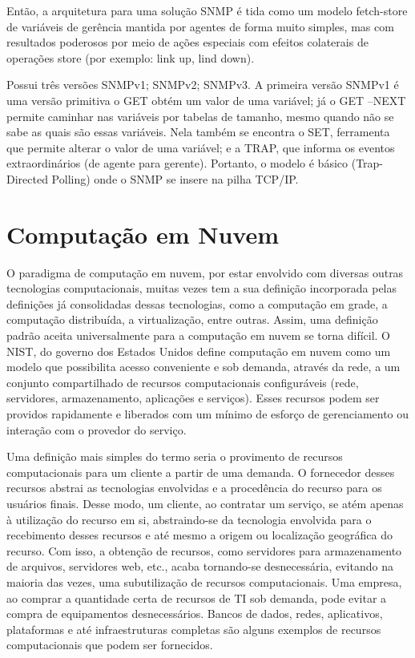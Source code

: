 Então, a arquitetura para uma solução SNMP é tida como um modelo fetch-store de
variáveis de gerência mantida por agentes de forma muito simples, mas com
resultados poderosos por meio de ações especiais com efeitos colaterais de
operações store (por exemplo: link up, lind down).

Possui três versões SNMPv1; SNMPv2; SNMPv3. A primeira versão SNMPv1 é uma
versão primitiva o GET obtém um valor de uma variável; já o GET –NEXT permite
caminhar nas variáveis por tabelas de tamanho, mesmo quando não se sabe as quais
são essas variáveis. Nela também se encontra o SET, ferramenta que permite
alterar o valor de uma variável; e a TRAP, que informa os eventos
extraordinários (de agente para gerente). Portanto, o modelo é básico
(Trap-Directed Polling) onde o SNMP se insere na pilha TCP/IP.

\lipsum[4]

\lipsum[5-6]

\chapter[Computação em Nuvem]{Computação em Nuvem}
\label{computacaoemnuvem}

O paradigma de computação em nuvem, por estar envolvido com diversas outras
tecnologias computacionais, muitas vezes tem a sua definição incorporada pelas
definições já consolidadas dessas tecnologias, como a computação em grade, a
computação distribuída, a virtualização, entre outras. Assim, uma definição
padrão aceita universalmente para a computação em nuvem se torna difícil. O
\textsf{NIST}, do governo dos Estados Unidos define computação em nuvem como um
modelo que possibilita acesso conveniente e sob demanda, através da rede, a um
conjunto compartilhado de recursos computacionais configuráveis (rede,
servidores, armazenamento, aplicações e serviços). Esses recursos podem ser
providos rapidamente e liberados com um mínimo de esforço de gerenciamento ou
interação com o provedor do serviço.

Uma definição mais simples do termo seria o provimento de recursos
computacionais para um cliente a partir de uma demanda. O fornecedor desses
recursos abstrai as tecnologias envolvidas e a procedência do recurso para os
usuários finais. Desse modo, um cliente, ao contratar um serviço, se atém apenas
à utilização do recurso em si, abstraindo-se da tecnologia envolvida para o
recebimento desses recursos e até mesmo a origem ou localização geográfica do
recurso. Com isso, a obtenção de recursos, como servidores para armazenamento de
arquivos, servidores web, etc., acaba tornando-se desnecessária, evitando na
maioria das vezes, uma subutilização de recursos computacionais. Uma empresa, ao
comprar a quantidade certa de recursos de TI sob demanda, pode evitar a compra
de equipamentos desnecessários. Bancos de dados, redes, aplicativos, plataformas
e até infraestruturas completas são alguns exemplos de recursos computacionais
que podem ser fornecidos.

